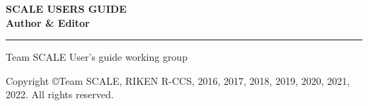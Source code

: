 \newpage
\thispagestyle{empty}

\vspace{10mm}
{\large{\bf SCALE USERS GUIDE}}\\


\vspace{10mm}
{\large{\bf Author \& Editor}}\\
\hrule width 90mm
\begin{tabbing}
Team SCALE User's guide working group\\
\end{tabbing}


\vspace{110mm}
\begin{flushright}

\vspace{10mm}
Copyright \copyright Team SCALE, RIKEN R-CCS, 2016, 2017, 2018, 2019, 2020, 2021, 2022. All rights reserved.
\end{flushright}

